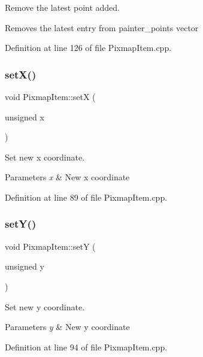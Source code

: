 Remove the latest point added. 

Removes the latest entry from painter\+\_\+points vector 

Definition at line 126 of file Pixmap\+Item.\+cpp.

\mbox{\label{classPixmapItem_a692a0aca72ffbe102769fdc9246ed2f6}} 
\subsubsection{\texorpdfstring{set\+X()}{setX()}}
{\footnotesize\ttfamily void Pixmap\+Item\+::setX (\begin{DoxyParamCaption}\item[{unsigned}]{x }\end{DoxyParamCaption})}



Set new x coordinate. 


\begin{DoxyParams}{Parameters}
{\em x} & New x coordinate \\
\hline
\end{DoxyParams}


Definition at line 89 of file Pixmap\+Item.\+cpp.

\mbox{\label{classPixmapItem_a6c6f4a872823f585edcf134d9bf209e1}} 
\subsubsection{\texorpdfstring{set\+Y()}{setY()}}
{\footnotesize\ttfamily void Pixmap\+Item\+::setY (\begin{DoxyParamCaption}\item[{unsigned}]{y }\end{DoxyParamCaption})}



Set new y coordinate. 


\begin{DoxyParams}{Parameters}
{\em y} & New y coordinate \\
\hline
\end{DoxyParams}


Definition at line 94 of file Pixmap\+Item.\+cpp.



